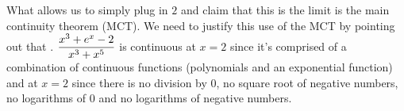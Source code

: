 \documentclass[10pt]{article}
\begin{document}
{{{\begin{solution}
What allows us to simply plug in $2$ and claim that this is the limit is the main continuity theorem (MCT). We need  to justify this use of the MCT by pointing out that  . $\displaystyle  \frac{x^3+e^x-2}{x^3+x^5}$ is continuous at $x=2$ since it's comprised of a combination of continuous functions (polynomials and an exponential function) and  at $x=2$ since there is no division by $0$, no square root of negative numbers, no logarithms of $0$ and no logarithms of negative numbers.
\end{solution}
}
~\\
~\\



}
}
\newpage
\end{document}

